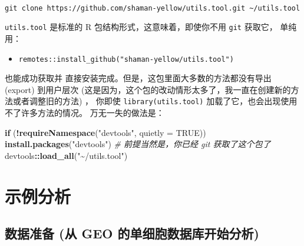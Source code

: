 \documentclass[
]{article}
\newenvironment{Shaded}{\begin{snugshade}}{\end{snugshade}}
\newcommand{\CommentTok}[1]{\textcolor[rgb]{0.56,0.35,0.01}{\textit{#1}}}
\newcommand{\ControlFlowTok}[1]{\textcolor[rgb]{0.13,0.29,0.53}{\textbf{#1}}}
\newcommand{\DataTypeTok}[1]{\textcolor[rgb]{0.13,0.29,0.53}{#1}}
\newcommand{\KeywordTok}[1]{\textcolor[rgb]{0.13,0.29,0.53}{\textbf{#1}}}
\newcommand{\NormalTok}[1]{#1}
\newcommand{\OperatorTok}[1]{\textcolor[rgb]{0.81,0.36,0.00}{\textbf{#1}}}
\newcommand{\OtherTok}[1]{\textcolor[rgb]{0.56,0.35,0.01}{#1}}
\newcommand{\StringTok}[1]{\textcolor[rgb]{0.31,0.60,0.02}{#1}}
\providecommand{\tightlist}{%
  \setlength{\itemsep}{0pt}\setlength{\parskip}{0pt}}
\begin{document}
\begin{tcolorbox}[colback = gray!10, colframe = red!50, width = 16cm, arc = 1mm, auto outer arc, title = {Bash input}]
\begin{verbatim}

git clone https://github.com/shaman-yellow/utils.tool.git ~/utils.tool

\end{verbatim}
\end{tcolorbox}

\texttt{utils.tool} 是标准的 R 包结构形式，这意味着，即使你不用 \texttt{git} 获取它，
单纯用：

\begin{itemize}
\tightlist
\item
  \texttt{remotes::install\_github("shaman-yellow/utils.tool")}
\end{itemize}

也能成功获取并 直接安装完成。但是，这包里面大多数的方法都没有导出 (export) 到用户层次
(这是因为，这个包的改动情形太多了，我一直在创建新的方法或者调整旧的方法) ，
你即使 \texttt{library(utils.tool)} 加载了它，也会出现使用不了许多方法的情况。
万无一失的做法是：

\begin{Shaded}
\begin{Highlighting}[]
\ControlFlowTok{if}\NormalTok{ (}\OperatorTok{!}\KeywordTok{requireNamespace}\NormalTok{(}\StringTok{"devtools"}\NormalTok{, }\DataTypeTok{quietly =} \OtherTok{TRUE}\NormalTok{))}
  \KeywordTok{install.packages}\NormalTok{(}\StringTok{"devtools"}\NormalTok{)}
\CommentTok{\# 前提当然是，你已经 git 获取了这个包了}
\NormalTok{devtools}\OperatorTok{::}\KeywordTok{load\_all}\NormalTok{(}\StringTok{"\textasciitilde{}/utils.tool"}\NormalTok{)}
\end{Highlighting}
\end{Shaded}

\hypertarget{ux793aux4f8bux5206ux6790}{%
\section{示例分析}\label{ux793aux4f8bux5206ux6790}}

\hypertarget{ux6570ux636eux51c6ux5907-ux4ece-geo-ux7684ux5355ux7ec6ux80deux6570ux636eux5e93ux5f00ux59cbux5206ux6790}{%
\subsection{数据准备 (从 GEO 的单细胞数据库开始分析)}\label{ux6570ux636eux51c6ux5907-ux4ece-geo-ux7684ux5355ux7ec6ux80deux6570ux636eux5e93ux5f00ux59cbux5206ux6790}}
\end{document}
